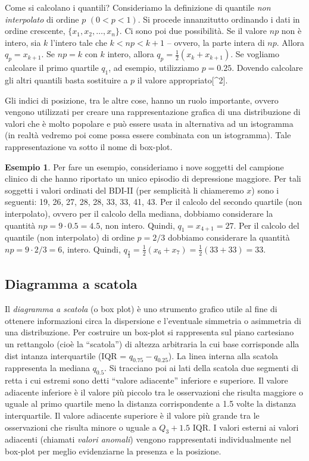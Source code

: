 \documentclass[
  11pt,
  italian,
  a4paper,
  extrafontsizes,onecolumn,openright
  ]{memoir}
\theoremstyle{definition}
\theoremstyle{definition}
\newtheorem{example}{Esempio}[chapter]
\theoremstyle{definition}
\theoremstyle{definition}
\theoremstyle{remark}
\begin{document}
Come si calcolano i quantili? Consideriamo la definizione di quantile
\emph{non interpolato} di ordine \(p\) \((0 < p < 1)\). Si procede innanzitutto
ordinando i dati in ordine crescente, \(\{x_1, x_2, \dots, x_n\}\). Ci
sono poi due possibilità. Se il valore \(np\) non è intero, sia \(k\)
l'intero tale che \(k < np < k + 1\) -- ovvero, la parte intera di \(np\).
Allora \(q_p = x_{k+1}.\) Se \(np = k\) con \(k\) intero, allora
\(q_p = \frac{1}{2}(x_{k} + x_{k+1}).\) Se vogliamo calcolare il primo
quartile \(q_1\), ad esempio, utilizziamo \(p = 0.25\). Dovendo calcolare
gli altri quantili basta sostituire a \(p\) il valore appropriato{[}\^{}2{]}.

Gli indici di posizione, tra le altre cose, hanno un ruolo importante,
ovvero vengono utilizzati per creare una rappresentazione grafica di una
distribuzione di valori che è molto popolare e può essere usata in
alternativa ad un istogramma (in realtà vedremo poi come possa essere
combinata con un istogramma). Tale rappresentazione va sotto il nome di
box-plot.

\begin{example}
Per fare un esempio, consideriamo i nove soggetti del campione clinico di \textcite{zetschefuture2019} che hanno riportato un unico episodio di depressione maggiore. Per tali soggetti i valori ordinati del BDI-II (per semplicità li chiameremo \(x\)) sono i seguenti: 19, 26, 27, 28, 28, 33, 33, 41, 43.
Per il calcolo del secondo quartile (non interpolato), ovvero per il calcolo della mediana, dobbiamo considerare la quantità \(np = 9 \cdot 0.5 = 4.5\), non intero. Quindi, \(q_1 = x_{4 + 1} = 27\).
Per il calcolo del quantile (non interpolato) di ordine \(p = 2/3\) dobbiamo considerare la quantità \(np = 9 \cdot 2/3 = 6\), intero. Quindi, \(q_{\frac{2}{3}} = \frac{1}{2} (x_{6} + x_{7}) = \frac{1}{2} (33 + 33) = 33\).
\end{example}

\hypertarget{diagramma-a-scatola}{%
\subsection{Diagramma a scatola}\label{diagramma-a-scatola}}

Il \emph{diagramma a scatola} (o box plot) è uno strumento grafico utile al
fine di ottenere informazioni circa la dispersione e l'eventuale
simmetria o asimmetria di una distribuzione. Per costruire un box-plot
si rappresenta sul piano cartesiano un rettangolo (cioè la ``scatola'') di
altezza arbitraria la cui base corrisponde alla dist intanza
interquartile (IQR = \(q_{0.75} - q_{0.25}\)). La linea interna alla
scatola rappresenta la mediana \(q_{0.5}\). Si tracciano poi ai lati della
scatola due segmenti di retta i cui estremi sono detti ``valore
adiacente'' inferiore e superiore. Il valore adiacente inferiore è il
valore più piccolo tra le osservazioni che risulta maggiore o uguale al
primo quartile meno la distanza corrispondente a 1.5 volte la distanza
interquartile.
Il valore adiacente superiore è il valore più grande tra le osservazioni che risulta minore o uguale a \(Q_3+1.5\) IQR. I valori esterni ai valori adiacenti (chiamati \emph{valori anomali}) vengono rappresentati individualmente nel box-plot per meglio evidenziarne la presenza e la posizione.
\end{document}

